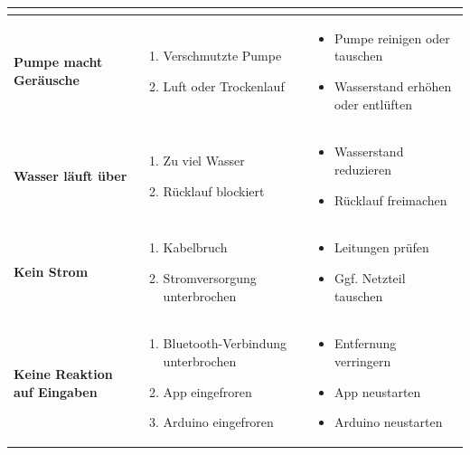 \begin{table}[h]
\begin{tabular}{|>{\centering\arraybackslash}m{4.5cm}|
			>{\centering\arraybackslash}m{5.2cm}|
			>{\centering\arraybackslash}m{5cm}|}
\begin{itemize}[nosep,leftmargin=*]
		\end{itemize} \\
		\hline
		\textbf{Pumpe macht Geräusche} 
		& \begin{enumerate}[nosep,leftmargin=*]
			\item Verschmutzte Pumpe
			\item Luft oder Trockenlauf
		\end{enumerate}
		& \begin{itemize}[nosep,leftmargin=*]
			\item Pumpe reinigen oder tauschen
			\item Wasserstand erhöhen oder entlüften
		\end{itemize} \\
		\hline
		\textbf{Wasser läuft über} 
		& \begin{enumerate}[nosep,leftmargin=*]
			\item Zu viel Wasser
			\item Rücklauf blockiert
		\end{enumerate}
		& \begin{itemize}[nosep,leftmargin=*]
			\item Wasserstand reduzieren
			\item Rücklauf freimachen
		\end{itemize} \\
		\hline
		\textbf{Kein Strom} 
		& \begin{enumerate}[nosep,leftmargin=*]
			\item Kabelbruch
			\item Stromversorgung unterbrochen
		\end{enumerate}
		& \begin{itemize}[nosep,leftmargin=*]
			\item Leitungen prüfen
			\item Ggf. Netzteil tauschen
		\end{itemize} \\
		\hline
		\textbf{Keine Reaktion auf Eingaben} 
		& \begin{enumerate}[nosep,leftmargin=*]
			\item Bluetooth-Verbindung unterbrochen
			\item App eingefroren
			\item Arduino eingefroren
		\end{enumerate}
		& \begin{itemize}[nosep,leftmargin=*]
			\item Entfernung verringern
			\item App neustarten
			\item Arduino neustarten
		\end{itemize} \\
		\hline
	\end{tabular}
\end{table}









